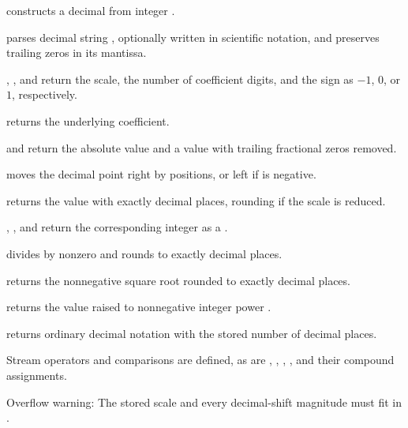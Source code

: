 \begin{compactitem}
  \item {} constructs a decimal from integer .
  \item {} parses decimal string , optionally written in scientific notation, and preserves trailing zeros in its mantissa.
  \item {}, , and  return the scale, the number of coefficient digits, and the sign as $-1$, $0$, or $1$, respectively.
  \item {} returns the underlying  coefficient.
  \item {} and  return the absolute value and a value with trailing fractional zeros removed.
  \item {} moves the decimal point right by  positions, or left if  is negative.
  \item {} returns the value with exactly  decimal places, rounding if the scale is reduced.
  \item {}, , and  return the corresponding integer as a .
  \item {} divides by nonzero  and rounds to exactly  decimal places.
  \item {} returns the nonnegative square root rounded to exactly  decimal places.
  \item {} returns the value raised to nonnegative integer power .
  \item {} returns ordinary decimal notation with the stored number of decimal places.
  \item Stream operators and comparisons are defined, as are \inlinecode{+}, \inlinecode{-}, \inlinecode{*}, \inlinecode{\%}, and their compound assignments.
\end{compactitem}

Overflow warning: The stored scale and every decimal-shift magnitude must fit in .

